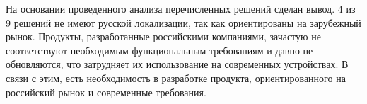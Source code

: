 \documentclass[./intro.tex]{subfiles}
\begin{document}
\par На основании проведенного анализа перечисленных решений сделан вывод. 4 из 9 решений не имеют русской локализации, так как ориентированы на зарубежный рынок.
Продукты, разработанные российскими компаниями, зачастую не соответствуют необходимым функциональным требованиям и давно не обновляются, что затрудняет их использование на современных устройствах.
В связи с этим, есть необходимость в разработке продукта, ориентированного на российский рынок и современные требования.
\end{document}
